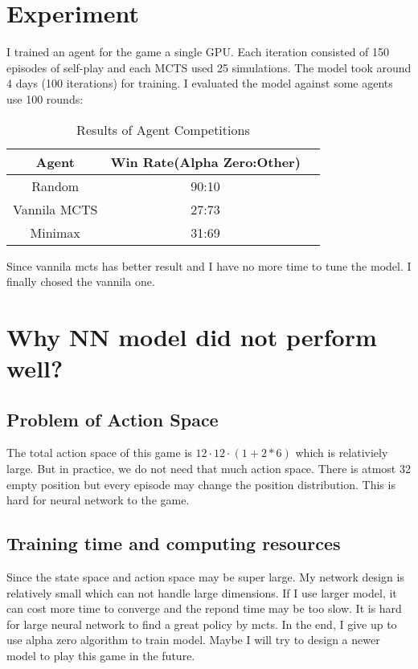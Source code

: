 \documentclass{article} %
\begin{document}
    \section{Experiment}
    I trained an agent for the game a single GPU. Each iteration consisted of 150 episodes of self-play and each MCTS used 25 simulations. 
    The model took around 4 days (100 iterations) for training. I evaluated the model against some agents use 100 rounds:
    \begin{table}[h]
        \centering
        \begin{tabular}{|c|c|c|}
        \hline
        \textbf{Agent} & \textbf{Win Rate(Alpha Zero:Other)} \\
        \hline
        Random & 90:10 \\
        \hline
        Vannila MCTS & 27:73 \\
        \hline
        Minimax & 31:69 \\
        \hline
        \end{tabular}
        \caption{Results of Agent Competitions}
        \label{tab:agent_competitions}
    \end{table}
    Since vannila mcts has better result and I have no more time to tune the model. I finally chosed the vannila one.

    \section{Why NN model did not perform well?}
    \subsection{Problem of Action Space}
    The total action space of this game is $12 \cdot 12 \cdot (1 + 2*6)$ which is relativiely large.
    But in practice, we do not need that much action space. There is atmost 32 empty position but every episode may change
    the position distribution. This is hard for neural network to the game.
    \subsection{Training time and computing resources}
    Since the state space and action space may be super large. My network design is relatively small which can not handle large dimensions.
    If I use larger model, it can cost more time to converge and the repond time may be too slow.
    It is hard for large neural network to find a great policy by mcts.
    In the end, I give up to use alpha zero algorithm to train model.
    Maybe I will try to design a newer model to play this game in the future.
    
\end{document}
